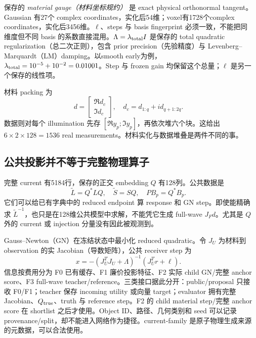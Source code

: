 \documentclass[UTF8,11pt,a4paper,fontset=fandol]{ctexart}
\begin{document}
保存的 \emph{material gauge（材料坐标规约）} 是 exact physical orthonormal tangent。Gaussian 有27个 complex coordinates，实化后54维；voxel有1728个complex coordinates，实化后3456维。$\ell$、steps 与 basis fingerprint 必须一致，不能把同维度但不同 basis 的系数直接混用。$\Lambda=\lambda_{\rm total}I$ 是保存的 total quadratic regularization（总二次正则），包含 prior precision（先验精度）与 Levenberg--Marquardt（LM）damping。以smooth early为例，$\lambda_{\rm total}=10^{-5}+10^{-2}=0.01001$。Step 与 frozen gain 均保留这个总量；$\ell$ 是另一个保存的线性项。

材料 packing 为
\[
 d=\begin{bmatrix}\Re d_c\\\Im d_c\end{bmatrix},\quad
 d_c=d_{1:q}+i d_{q+1:2q}.
\]
数据则对每个 illumination 先存 $[\Re y_p;\Im y_p]$，再依次堆六个块。这给出 $6\times2\times128=1536$ real measurements。材料实化与数据堆叠是两件不同的事。

\subsection{公共投影并不等于完整物理算子}
完整 current 有5184行，保存的正交 embedding $Q$ 有128列。公共数据是
\[
 \widetilde L=Q^*LQ,\quad \widetilde S=SQ,\quad PB_p=Q^*B_p.
\]
它们可以给已有字典中的 reduced endpoint 算 response 和 GN step。即使能精确求 $\widetilde L^{-1}$，也只是在128维公共模型中求解，不能凭它生成 full-wave $J_Fd$。尤其是 $Q$ 外的 current 或 injection 分量没有因此被观测到。

Gauss--Newton（GN）在冻结状态中最小化 reduced quadratic。令 $J_U$ 为材料到 observation 的实 Jacobian（导数矩阵），公共 receiver step 为
\[
 x=-(J_U^TJ_U+\Lambda)^{-1}(J_U^Tr+\ell).
\]
信息按费用分为 F0 已有缓存、F1 廉价投影特征、F2 实际 child GN/完整 anchor score、F3 full-wave teacher/reference。三类接口据此分开：public/proposal 只接收 F0/F1；teacher 保存 incoming utility 或向量 target；evaluator 拥有完整 Jacobian、$Q_{\rm true}$、truth 与 reference step。F2 的 child material step/完整 anchor score 在 shortlist 之后才使用。Object ID、路径、几何类别和 seed 可以记录 provenance/split，却不能进入网络作为捷径。current-family 是原子物理生成来源的元数据，可以合法使用。
\end{document}
